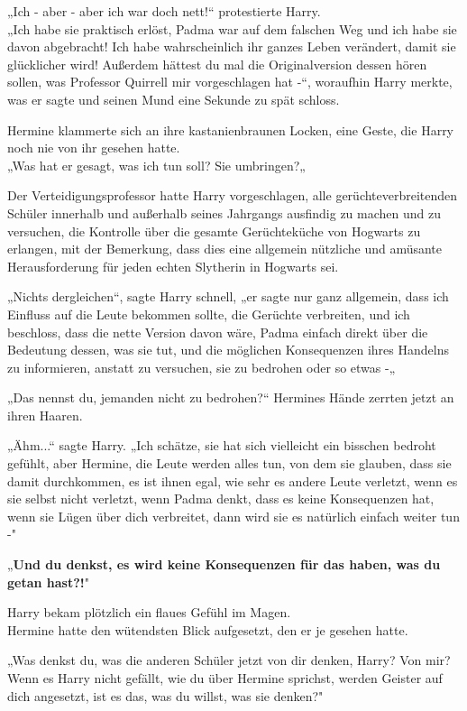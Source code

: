 {„Ich - aber - aber ich war doch nett!“ protestierte Harry.\\ „Ich habe sie praktisch erlöst, Padma war auf dem falschen Weg und ich habe sie davon abgebracht! Ich habe wahrscheinlich ihr ganzes Leben verändert, damit sie glücklicher wird! Außerdem hättest du mal die Originalversion dessen hören sollen, was Professor Quirrell mir vorgeschlagen hat -“, woraufhin Harry merkte, was er sagte und seinen Mund eine Sekunde zu spät schloss.

Hermine klammerte sich an ihre kastanienbraunen Locken, eine Geste, die Harry noch nie von ihr gesehen hatte.\\ „Was hat er gesagt, was ich tun soll? Sie umbringen?„

Der Verteidigungsprofessor hatte Harry vorgeschlagen, alle gerüchteverbreitenden Schüler innerhalb und außerhalb seines Jahrgangs ausfindig zu machen und zu versuchen, die Kontrolle über die gesamte Gerüchteküche von Hogwarts zu erlangen, mit der Bemerkung, dass dies eine allgemein nützliche und amüsante Herausforderung für jeden echten Slytherin in Hogwarts sei.

„Nichts dergleichen“, sagte Harry schnell, „er sagte nur ganz allgemein, dass ich Einfluss auf die Leute bekommen sollte, die Gerüchte verbreiten, und ich beschloss, dass die nette Version davon wäre, Padma einfach direkt über die Bedeutung dessen, was sie tut, und die möglichen Konsequenzen ihres Handelns zu informieren, anstatt zu versuchen, sie zu bedrohen oder so etwas -„

„Das nennst du, jemanden nicht zu bedrohen?“ Hermines Hände zerrten jetzt an ihren Haaren.

„Ähm...“ sagte Harry. „Ich schätze, sie hat sich vielleicht ein bisschen bedroht gefühlt, aber Hermine, die Leute werden alles tun, von dem sie glauben, dass sie damit durchkommen, es ist ihnen egal, wie sehr es andere Leute verletzt, wenn es sie selbst nicht verletzt, wenn Padma denkt, dass es keine Konsequenzen hat, wenn sie Lügen über dich verbreitet, dann wird sie es natürlich einfach weiter tun -"

„\textbf{Und du denkst, es wird keine Konsequenzen für das haben, was du getan hast?!}"

Harry bekam plötzlich ein flaues Gefühl im Magen.\\ Hermine hatte den wütendsten Blick aufgesetzt, den er je gesehen hatte.

„Was denkst du, was die anderen Schüler jetzt von dir denken, Harry? Von mir? Wenn es Harry nicht gefällt, wie du über Hermine sprichst, werden Geister auf dich angesetzt, ist es das, was du willst, was sie denken?"

}
